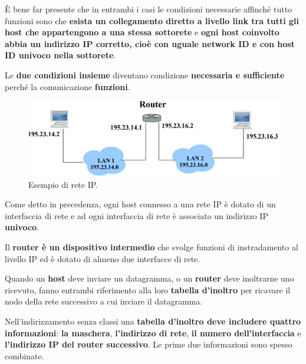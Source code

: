 \documentclass[11pt,a4paper,oneside]{book}
\theoremstyle{definition}
\begin{document}
È bene far presente che in entrambi i casi le condizioni necessarie affinché tutto funzioni sono che \textbf{esista un collegamento diretto a livello link tra tutti gli host che appartengono a una stessa sottorete} e \textbf{ogni host coinvolto abbia un indirizzo IP corretto, cioè con uguale network ID  e con host ID univoco nella sottorete}.

Le \textbf{due condizioni insieme} diventano condizione \textbf{necessaria e sufficiente} perché la comunicazione \textbf{funzioni}.

\begin{figure}[!h]
	\includegraphics[scale=0.35]{Immagini/Ip_net.png}
	\centering
	\caption{Esempio di rete IP.}
\end{figure}

Come detto in precedenza, ogni host connesso a una rete IP è dotato di un interfaccia di rete e ad ogni interfaccia di rete è associato un indirizzo IP \textbf{univoco}.

Il \textbf{router è un dispositivo intermedio} che svolge funzioni di instradamento al livello IP ed è dotato di almeno due interfacce di rete.

Quando un \textbf{host} deve inviare un datagramma, o un \textbf{router} deve inoltrarne uno ricevuto, fanno entrambi riferimento alla loro \textbf{tabella d'inoltro} per ricavare il nodo della rete successivo a cui inviare il datagramma.

Nell'indirizzamento senza classi una \textbf{tabella d'inoltro deve includere quattro informazioni}: \textbf{la maschera}, \textbf{l'indirizzo di rete}, \textbf{il numero dell'interfaccia} e \textbf{l'indirizzo IP del router successivo}. Le prime due informazioni sono spesso combinate.

\pagebreak
\end{document}
